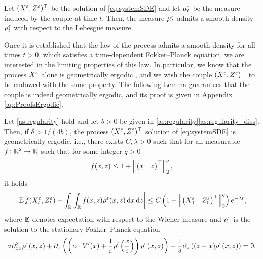 \documentclass[review,onefignum,onetabnum]{siamonline190516}
\begin{document}
\begin{lemma}\label{lem:density} Let $(X^\varepsilon, Z^\varepsilon)^\top$ be the solution of \eqref{eq:systemSDE} and let $\mu^\varepsilon_t$ be the measure induced by the couple at time $t$. Then, the measure $\mu^\varepsilon_t$ admits a smooth density $\rho^\varepsilon_t$ with respect to the Lebesgue measure.
\end{lemma}


Once it is established that the law of the process admits a smooth density for all times $t>0$, which satisfies a time-dependent Fokker--Planck equation, we are interested in the limiting properties of this law. In particular, we know that the process $X^\varepsilon$ alone is geometrically ergodic \cite[Theorem 4.4]{MSH02}, and we wish the couple $(X^\varepsilon, Z^\varepsilon)^\top$ to be endowed with the same property. The following Lemma guarantees that the couple is indeed geometrically ergodic, and its proof is given in Appendix \ref{ap:ProofsErgodic}.

\begin{lemma}\label{lem:ergodicity} Let \cref{as:regularity} hold and let $b > 0$ be given in \cref{as:regularity}\ref{as:regularity_diss}. Then, if $\delta > 1/(4b)$, the process $(X^\varepsilon, Z^\varepsilon)^\top$ solution of \eqref{eq:systemSDE} is geometrically ergodic, i.e., there exists $C, \lambda > 0$ such that for all measurable $f\colon \mathbb{R}^2\to \mathbb{R}$ such that for some integer $q > 0$ 
	\begin{equation}
		f(x, z) \leq 1 + \left\|\begin{pmatrix} x & z \end{pmatrix}^\top\right\|_2^q,
	\end{equation}
	it holds
	\begin{equation}
		\left\lvert\operatorname{\mathbb{E}} f(X^\varepsilon_t, Z^\varepsilon_t) - \int_{\mathbb{R}}\int_{\mathbb{R}} f(x, z) \rho^\varepsilon(x, z) \,\mathrm{d} x \,\mathrm{d} z\right\rvert \leq C\left(1 + \left\|\begin{pmatrix} X^\varepsilon_0 & Z^\varepsilon_0 \end{pmatrix}^\top\right\|_2^q \right)e^{-\lambda t},
	\end{equation}
	where $\operatorname{\mathbb{E}}$ denotes expectation with respect to the Wiener measure and $\rho^\varepsilon$ is the solution to the stationary Fokker--Planck equation
	\begin{equation}
	\label{eq:FPsystem}
	\sigma \partial^2_{xx} \rho^\epl(x,z) +  \partial_x \left( \left( \alpha \cdot V'(x) + \frac{1}{\epl} p' \left ( \frac{x}\epl \right ) \right ) \rho^\epl(x,z) \right) + \frac{1}{\delta} \partial_z \left((z - x) \rho^\epl(x,z)\right) = 0.
	\end{equation}
\end{lemma}
\end{document}
